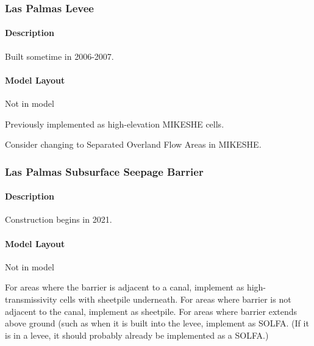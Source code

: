\subsubsection{Las Palmas Levee}

\paragraph{Description}
Built sometime in 2006-2007.

\paragraph{Model Layout}
Not in model


\begin{notes}
Previously implemented as high-elevation MIKESHE cells.

Consider changing to Separated Overland Flow Areas in MIKESHE.
\end{notes}


\subsubsection{Las Palmas Subsurface Seepage Barrier}

\paragraph{Description}
Construction begins in 2021.

\paragraph{Model Layout}
Not in model


\begin{notes}
For areas where the barrier is adjacent to a canal, implement as high-transmissivity cells with sheetpile underneath.
For areas where barrier is not adjacent to the canal, implement as sheetpile.
For areas where barrier extends above ground (such as when it is built into the levee, implement as SOLFA. (If it is in a levee, it should probably already be implemented as a SOLFA.)
\end{notes}


